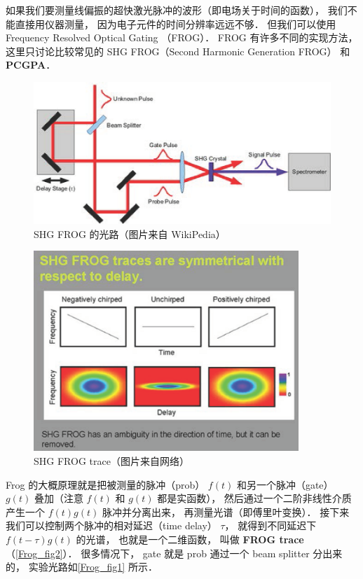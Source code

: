 
如果我们要测量线偏振的超快激光脉冲的波形（即电场关于时间的函数）， 我们不能直接用仪器测量， 因为电子元件的时间分辨率远远不够． 但我们可以使用 Frequency Resolved Optical Gating （FROG）． FROG 有许多不同的实现方法， 这里只讨论比较常见的 SHG FROG（Second Harmonic Generation FROG） 和 \textbf{PCGPA}．

\begin{figure}[ht]
\centering
\includegraphics[width=12cm]{./figures/Frog1.png}
\caption{SHG FROG 的光路（图片来自 WikiPedia）} \label{Frog_fig1}
\end{figure}

\begin{figure}[ht]
\centering
\includegraphics[width=10cm]{./figures/Frog2.png}
\caption{SHG FROG trace（图片来自网络）} \label{Frog_fig2}
\end{figure}

Frog 的大概原理就是把被测量的脉冲（prob） $f(t)$ 和另一个脉冲（gate） $g(t)$ 叠加（注意 $f(t)$ 和 $g(t)$ 都是实函数）， 然后通过一个二阶非线性介质产生一个 $f(t)g(t)$ 脉冲并分离出来， 再测量光谱（即傅里叶变换）． 接下来我们可以控制两个脉冲的相对延迟（time delay） $\tau$， 就得到不同延迟下 $f(t - \tau)g(t)$ 的光谱， 也就是一个二维函数， 叫做 \textbf{FROG trace}（\autoref{Frog_fig2}）． 很多情况下， gate 就是 prob 通过一个 beam splitter 分出来的， 实验光路如\autoref{Frog_fig1} 所示．%

